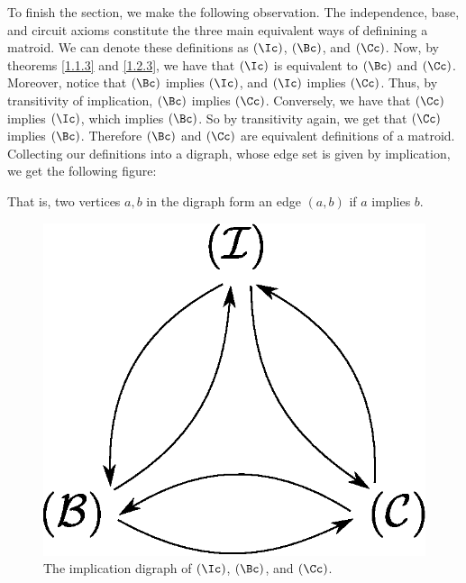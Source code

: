 To finish the section, we make the following observation. The independence,
base, and circuit axioms constitute the three main equivalent ways of definining
a matroid. We can denote these definitions as $(\Ic)$, $(\Bc)$, and $(\Cc)$.
Now, by theorems \ref{1.1.3} and  \ref{1.2.3}, we have that $(\Ic)$ is
equivalent to  $(\Bc)$ and $(\Cc)$. Moreover, notice that $(\Bc)$ implies
$(\Ic)$, and $(\Ic)$ implies $(\Cc)$. Thus, by transitivity of implication,
$(\Bc)$ implies $(\Cc)$. Conversely, we have that $(\Cc)$ implies $(\Ic)$, which
implies $(\Bc)$. So by transitivity again, we get that $(\Cc)$ implies $(\Bc)$.
Therefore $(\Bc)$ and $(\Cc)$ are equivalent definitions of a matroid. Collecting
our definitions into a digraph, whose edge set is given by implication,
we get the following figure:
\begin{remark}
    That is, two vertices $a,b$ in the digraph form an edge  $(a,b)$ if $a$
    implies  $b$.
\end{remark}

\begin{figure}[h]
    \centering
    \includegraphics[scale=0.5]{Figures/chapter1/equiv_def_1.eps}
    \caption{The implication digraph of $(\Ic)$, $(\Bc)$, and $(\Cc)$.}
    \label{fig_1.5}
\end{figure}
